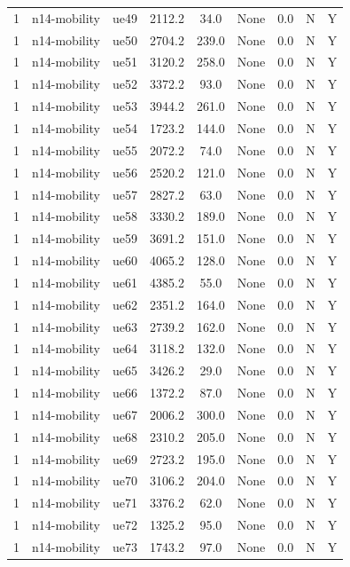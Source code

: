 \begin{table}[ht]
\begin{tabular}{|c|c|c|c|c|c|c|c|c|}
1 & n14-mobility & ue49 & 2112.2 & 34.0 & None & 0.0 & N & Y \\
1 & n14-mobility & ue50 & 2704.2 & 239.0 & None & 0.0 & N & Y \\
1 & n14-mobility & ue51 & 3120.2 & 258.0 & None & 0.0 & N & Y \\
1 & n14-mobility & ue52 & 3372.2 & 93.0 & None & 0.0 & N & Y \\
1 & n14-mobility & ue53 & 3944.2 & 261.0 & None & 0.0 & N & Y \\
1 & n14-mobility & ue54 & 1723.2 & 144.0 & None & 0.0 & N & Y \\
1 & n14-mobility & ue55 & 2072.2 & 74.0 & None & 0.0 & N & Y \\
1 & n14-mobility & ue56 & 2520.2 & 121.0 & None & 0.0 & N & Y \\
1 & n14-mobility & ue57 & 2827.2 & 63.0 & None & 0.0 & N & Y \\
1 & n14-mobility & ue58 & 3330.2 & 189.0 & None & 0.0 & N & Y \\
1 & n14-mobility & ue59 & 3691.2 & 151.0 & None & 0.0 & N & Y \\
1 & n14-mobility & ue60 & 4065.2 & 128.0 & None & 0.0 & N & Y \\
1 & n14-mobility & ue61 & 4385.2 & 55.0 & None & 0.0 & N & Y \\
1 & n14-mobility & ue62 & 2351.2 & 164.0 & None & 0.0 & N & Y \\
1 & n14-mobility & ue63 & 2739.2 & 162.0 & None & 0.0 & N & Y \\
1 & n14-mobility & ue64 & 3118.2 & 132.0 & None & 0.0 & N & Y \\
1 & n14-mobility & ue65 & 3426.2 & 29.0 & None & 0.0 & N & Y \\
1 & n14-mobility & ue66 & 1372.2 & 87.0 & None & 0.0 & N & Y \\
1 & n14-mobility & ue67 & 2006.2 & 300.0 & None & 0.0 & N & Y \\
1 & n14-mobility & ue68 & 2310.2 & 205.0 & None & 0.0 & N & Y \\
1 & n14-mobility & ue69 & 2723.2 & 195.0 & None & 0.0 & N & Y \\
1 & n14-mobility & ue70 & 3106.2 & 204.0 & None & 0.0 & N & Y \\
1 & n14-mobility & ue71 & 3376.2 & 62.0 & None & 0.0 & N & Y \\
1 & n14-mobility & ue72 & 1325.2 & 95.0 & None & 0.0 & N & Y \\
1 & n14-mobility & ue73 & 1743.2 & 97.0 & None & 0.0 & N & Y \\

\end{tabular}
\end{table}
